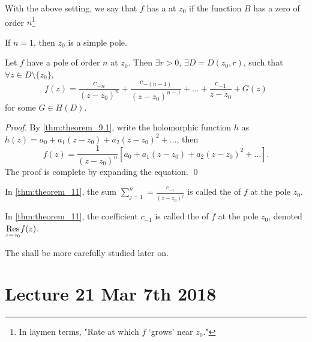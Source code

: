 \documentclass[11pt, oneside]{book}
\begin{document}
\begin{defn}\label{defn:pole_of_order_n_&_simple_pole}
	With the above setting, we say that $f$ has a  at $z_0$ if the function $B$ has a zero of order $n$\footnote{In laymen terms, "Rate at which $f$ `grows' near $z_0$."}

	If $n = 1$, then $z_0$ is a simple pole.
\end{defn}

\begin{thm}[Theorem 11]\label{thm:theorem_11}
	Let $f$ have a pole of order $n$ at $z_0$. Then $\exists r > 0, \, \exists D = D(z_0, r)$, such that $\forall z \in D \setminus \{z_0\}$,
	\begin{equation*}
		f(z) = \frac{c_{-n}}{(z - z_0)^n} + \frac{c_{-(n - 1)}}{(z - z_0)^{n - 1}} + \hdots + \frac{c_{-1}}{z - z_0} + G(z)
	\end{equation*}
	for some $G \in H(D)$.
\end{thm}

\begin{proof}
	By \cref{thm:theorem_9.1}, write the holomorphic function $h$ as $h(z) = a_0 + a_1 (z - z_0) + a_2 (z - z_0)^2 + \hdots$, then
	\begin{equation*}
		f(z) = \frac{1}{(z - z_0)^n} \left[ a_0 + a_1 (z - z_0) + a_2 (z - z_0)^2 + \hdots \right].
	\end{equation*}
	The proof is complete by expanding the equation. \qed
\end{proof}

\begin{defn}\label{defn:principal_part}
	In \cref{thm:theorem_11}, the sum $\sum_{j=1}^{n} = \frac{c_{-j}}{(z - z_0)^j}$ is called the  of $f$ at the pole $z_0$.
\end{defn}

\begin{defn}[Residue]\label{defn:residue}
	In \cref{thm:theorem_11}, the coefficient $c_{-1}$ is called the  of $f$ at the pole $z_0$, denoted $\res{f(z)}{z = z_0}$.
\end{defn}

The  shall be more carefully studied later on.



\chapter{Lecture 21 Mar 7th 2018}
	\label{chapter:lecture_21_mar_7th_2018}
\end{document}
